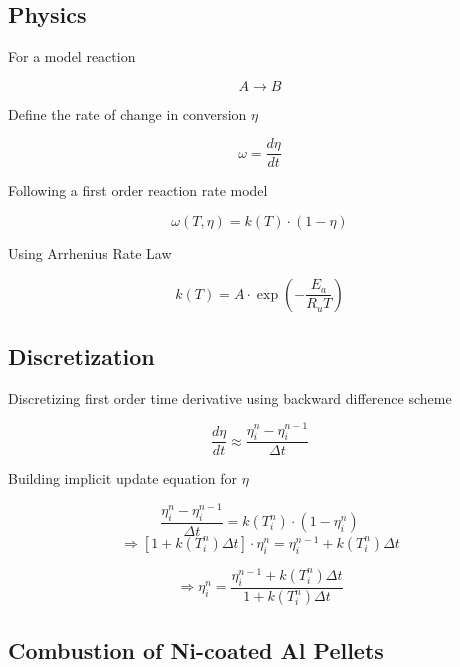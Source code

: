 \documentclass[../main.tex]{subfiles}
\begin{document}
\subsection{Physics}

For a model reaction

$$ A \longrightarrow B $$

\noindent
Define the rate of change in conversion $\eta$

\begin{equation}
    \omega = \frac{d\eta}{dt}
\end{equation}

\noindent
Following a first order reaction rate model

\begin{equation}
    \omega(T, \eta) = k(T) \cdot (1-\eta)
\end{equation}

\noindent
Using Arrhenius Rate Law

\begin{equation}
    k(T) = A \cdot \exp{\left(-\frac{E_a}{R_u T}\right)}
\end{equation}



\subsection{Discretization}

Discretizing first order time derivative using backward difference scheme

\begin{equation}
    \frac{d\eta}{dt} \approx \frac{\eta_i^{n} - \eta_i^{n-1}}{\Delta t}
\end{equation}

\noindent
Building implicit update equation for $\eta$

$$
\frac{\eta_i^{n} - \eta_i^{n-1}}{\Delta t} = k\left(T_i^n\right) \cdot \left( 1 - \eta_i^{n} \right)
$$
$$
\Rightarrow \left[ 1 + k\left( T_i^n \right)\Delta t \right] \cdot \eta_i^n = \eta_i^{n-1} + k\left(T_i^n\right) \Delta t
$$

\begin{equation}
    \Rightarrow \eta_i^n = \frac{\eta_i^{n-1} + k\left(T_i^n\right) \Delta t}{1 + k\left( T_i^n \right)\Delta t}
\end{equation}



\subsection{Combustion of Ni-coated Al Pellets}
\end{document}
